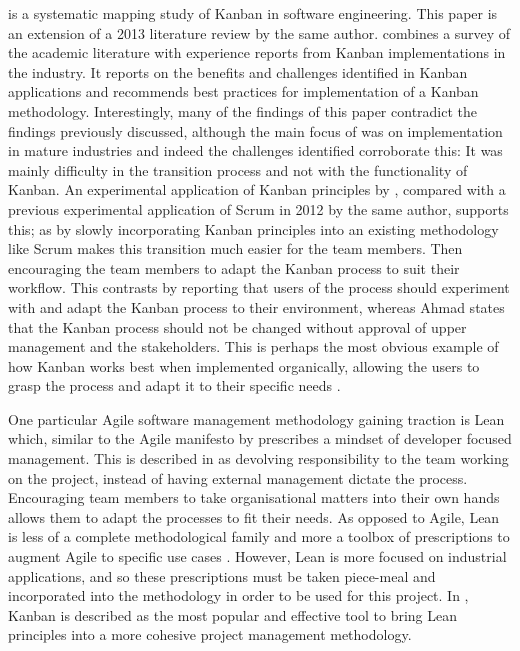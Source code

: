 \documentclass[hidelinks,journal]{IEEEtran}
\begin{document}
\textcite{Ahmad17} is a systematic mapping study of Kanban in software engineering. This paper is an extension of a 2013 literature review by the same author. \textcite{Ahmad17} combines a survey of the academic literature with experience reports from Kanban implementations in the industry. It reports on the benefits and challenges identified in Kanban applications and recommends best practices for implementation of a Kanban methodology. Interestingly, many of the findings of this paper contradict the findings previously discussed, although the main focus of \textcite{Ahmad17} was on implementation in mature industries and indeed the challenges identified corroborate this: It was mainly difficulty in the transition process and not with the functionality of Kanban. An experimental application of Kanban principles by \textcite{Mahnic13}, compared with a previous experimental application of Scrum in 2012 by the same author, supports this; as by slowly incorporating Kanban principles into an existing methodology like Scrum makes this transition much easier for the team members. Then encouraging the team members to adapt the Kanban process to suit their workflow. This contrasts \textcite{Ahmad17} by reporting that users of the process should experiment with and adapt the Kanban process to their environment, whereas Ahmad states that the Kanban process should not be changed without approval of upper management and the stakeholders. This is perhaps the most obvious example of how Kanban works best when implemented organically, allowing the users to grasp the process and adapt it to their specific needs \parencite{Mahnic13}.

One particular Agile software management methodology gaining traction is Lean \parencite{Corona13} which, similar to the Agile manifesto by \textcite{Beck01} prescribes a mindset of developer focused management. This is described in \textcite{Poppendieck13} as devolving responsibility to the team working on the project, instead of having external management dictate the process. Encouraging team members to take organisational matters into their own hands allows them to adapt the processes to fit their needs. As opposed to Agile, Lean is less of a complete methodological family and more a toolbox of prescriptions to augment Agile to specific use cases \parencite{Corona13}. However, Lean is more focused on industrial applications, and so these prescriptions must be taken piece-meal and incorporated into the methodology in order to be used for this project. In \textcite{Corona13}, Kanban is described as the most popular and effective tool to bring Lean principles into a more cohesive project management methodology.
\end{document}
